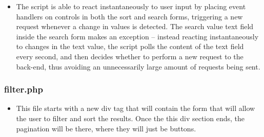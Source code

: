 \begin{itemize}
\begin{itemize}
                \item The script is able to react instantaneously to user input by placing event handlers on controls in both the sort and search forms, triggering a new request whenever
                a change in values is detected. The search value text field inside the search form makes an exception -- instead reacting instantaneously to changes in the text value,
                the script polls the content of the text field every second, and then decides whether to perform a new request to the back-end, thus avoiding an unnecessarily large amount
                of requests being sent.
            \end{itemize}
        \end{itemize}
    

    \subsubsection{filter.php}
        \begin{itemize}
            \item This file starts with a new div tag that will contain the form that will allow the user to filter and sort the results. Once the this div section ends, the pagination will be there, where they will just be buttons.
        \end{itemize}

